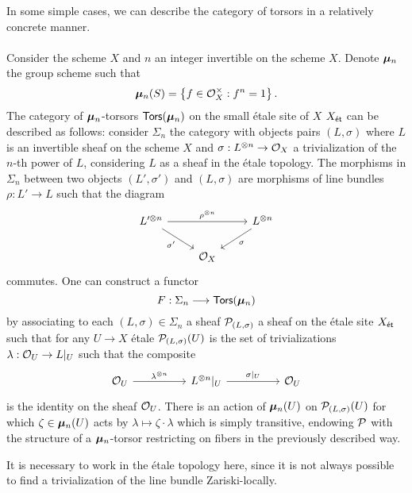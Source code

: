 In some simple cases, we can describe the category of torsors in a relatively concrete manner. 
\\\\
Consider the scheme $X$ and $n$ an integer invertible on the scheme $X$. Denote $\bm{\mu}_{n}$ the group scheme such that 
$$\bm{\mu}_{n}(S)=\left\{f\in\mathcal{O}_{X}^{\times}:f^{n}=1\right\}.$$
The category of $\bm{\mu}_{n}$-torsors $\mathsf{Tors}(\bm{\mu}_{n})$ on the small \'{e}tale site of $X$ $X_{\mathsf{\acute{e}t}}$ can be described as follows: consider $\Sigma_{n}$ the category with objects pairs $(L,\sigma)$ where $L$ is an invertible sheaf on the scheme $X$ and $\sigma:L^{\otimes n}\to\mathcal{O}_{X}$ a trivialization of the $n$-th power of $L$, considering $L$ as a sheaf in the \'{e}tale topology. The morphisms in $\Sigma_{n}$ between two objects $(L',\sigma')$ and $(L,\sigma)$ are morphisms of line bundles $\rho:L'\to L$ such that the diagram 
$$%
\begin{tikzcd}
	{L'^{\otimes n}} && {L^{\otimes n}} \\
	& {\Ocal_{X}}
	\arrow["{\sigma'}"', from=1-1, to=2-2]
	\arrow["\sigma", from=1-3, to=2-2]
	\arrow["{\rho^{\otimes n}}", from=1-1, to=1-3]
\end{tikzcd}$$
commutes. One can construct a functor 
$$F:\Sigma_{n}\longrightarrow\mathsf{Tors}(\bm{\mu}_{n})$$
by associating to each $(L,\sigma)\in\Sigma_{n}$ a sheaf $\mathcal{P}_{(L,\sigma)}$ a sheaf on the \'{e}tale site $X_{\mathsf{\acute{e}t}}$ such that for any $U\to X$ \'{e}tale $\mathcal{P}_{(L,\sigma)}(U)$ is the set of trivializations $\lambda:\mathcal{O}_{U}\to L|_{U}$ such that the composite 
$$%
\begin{tikzcd}
	{\Ocal_{U}} && {L^{\otimes n}|_{U}} && {\Ocal_{U}}
	\arrow["{\sigma|_{U}}", from=1-3, to=1-5]
	\arrow["{\lambda^{\otimes n}}", from=1-1, to=1-3]
\end{tikzcd}$$
is the identity on the sheaf $\mathcal{O}_{U}$. There is an action of $\bm{\mu}_{n}(U)$ on $\mathcal{P}_{(L,\sigma)}(U)$ for which $\zeta\in\bm{\mu}_{n}(U)$ acts by $\lambda\mapsto \zeta\cdot\lambda$ which is simply transitive, endowing $\mathcal{P}$ with the structure of a $\bm{\mu}_{n}$-torsor restricting on fibers in the previously described way. 
\begin{remark}
    It is necessary to work in the \'{e}tale topology here, since it is not always possible to find a trivialization of the line bundle Zariski-locally. 
\end{remark}